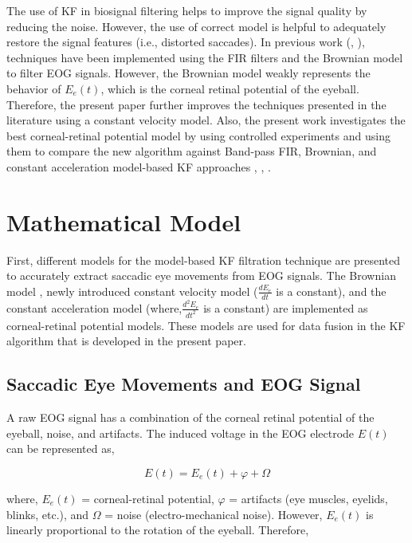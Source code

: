 \documentclass[transmag]{IEEEtran}
\begin{document}
The use of KF in biosignal filtering helps to improve the signal quality by reducing the noise. However, the use of correct model is helpful to adequately restore the signal features (i.e., distorted saccades). In previous work (\cite{ref4}, \cite{ref5}), techniques have been implemented using the FIR filters and the Brownian model to filter EOG signals. However, the Brownian model weakly represents the behavior of $E_e (t)$, which is the corneal retinal potential of the eyeball. Therefore, the present paper further improves the techniques presented in the literature using a constant velocity model. Also, the present work investigates the best corneal-retinal potential model by using controlled experiments and using them to compare the new algorithm against Band-pass FIR, Brownian, and constant acceleration model-based KF approaches \cite{ref4}, \cite{ref5}, \cite{ref7}. 

\section{Mathematical Model}
\label{section3}

First, different models for the model-based KF filtration technique are presented to accurately extract saccadic eye movements from EOG signals. The Brownian model \cite{ref5}, newly introduced constant velocity model ($\frac{dE_e}{dt}$ is a constant), and the constant acceleration model \cite{ref7}  (where,$\frac{d^2E_e}{dt^2}$ is a constant) are implemented as corneal-retinal potential models. These models are used for data fusion in the KF algorithm that is developed in the present paper.

\subsection{Saccadic Eye Movements and EOG Signal}

A raw EOG signal has a combination of the corneal retinal potential of the eyeball, noise, and artifacts. The induced voltage in the EOG electrode $E(t)$ can be represented as, 

\begin{equation}
E(t) = E_e(t)+\varphi+\Omega
\end{equation}

where, $E_e(t)$ = corneal-retinal potential,  $\varphi$ =  artifacts (eye muscles, eyelids, blinks, etc.), and $\Omega$ =  noise (electro-mechanical noise). However, $E_e(t)$ is linearly proportional to the rotation of the eyeball. Therefore, 
\end{document}
